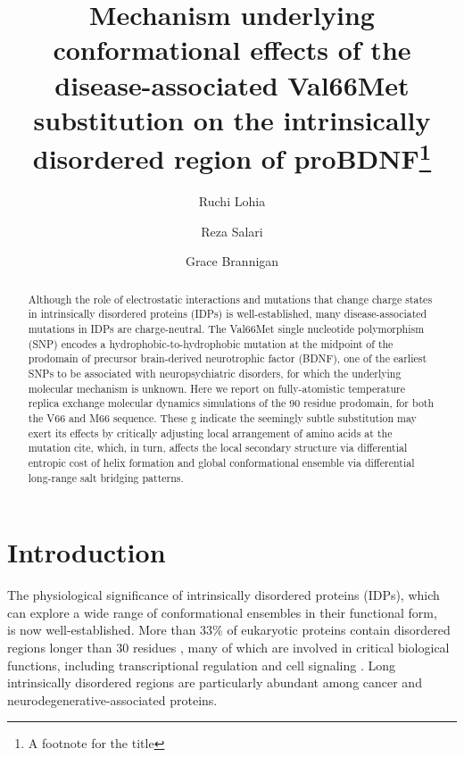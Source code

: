 \documentclass[journal=jacsat,manuscript=article]{achemso}
\author{Ruchi Lohia}
\author{Reza Salari}
\author{Grace Brannigan}
\affiliation[Rutgers University]
{Center for Computational and Integrative Biology, Rutgers University, Camden, NJ, USA}
\title[An \textsf{achemso} demo]
  {Mechanism underlying conformational effects of the disease-associated Val66Met substitution on the intrinsically disordered region of proBDNF\footnote{A footnote for the title}}
\begin{document}
\begin{abstract}
Although the role of electrostatic interactions and mutations that change charge states in intrinsically disordered proteins (IDPs) is well-established, many disease-associated mutations in IDPs are charge-neutral. The Val66Met single nucleotide polymorphism (SNP) encodes a hydrophobic-to-hydrophobic mutation at the midpoint of the prodomain of precursor brain-derived neurotrophic factor (BDNF), one of the earliest SNPs to be associated with neuropsychiatric disorders, for which the underlying molecular mechanism is unknown. Here we report on fully-atomistic temperature replica exchange molecular dynamics simulations of the 90 residue prodomain, for both the V66 and M66 sequence.
These g indicate the seemingly subtle substitution may exert its effects by critically adjusting local arrangement of amino acids at the mutation cite, which, in turn, affects the local secondary structure via differential entropic cost of helix formation and global conformational ensemble via differential long-range salt bridging patterns. 
\end{abstract}


\section*{Introduction}

The physiological significance of intrinsically disordered proteins (IDPs), which can explore a wide range of conformational ensembles in their functional form, ~\cite {Uversky2013a,Panchenko2015,Ward2004a,Dyson2005a} is now well-established. More than 33\% of eukaryotic proteins contain disordered regions longer than 30 residues \cite{Ward2004a}, many of which are involved in critical biological functions, including transcriptional regulation and cell signaling \cite{Dunker2005}.  Long intrinsically disordered regions are particularly abundant among cancer and neurodegenerative-associated proteins\cite{Habchi2014,Babu2011}.  
\end{document}
